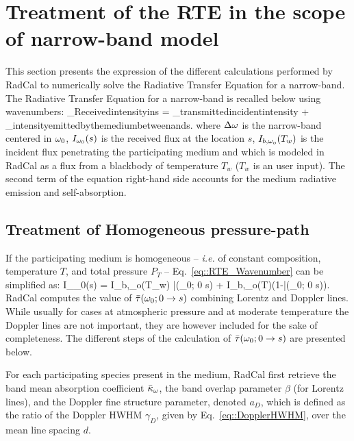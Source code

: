 \section{Treatment of the RTE in the scope of narrow-band model}\label{sec:RTE_NB}
This section presents the expression of the different calculations performed by RadCal to numerically solve the Radiative Transfer Equation for a narrow-band. The Radiative Transfer Equation for a narrow-band is recalled below using wavenumbers:
\be\label{eq::RTE_Wavenumber}
_{\rm Received\:intensity\:in\:s}  = _{\rm transmitted\:incident\:intensity} + _{\rm intensity\:emitted\:by\:the\:medium\:between\:and\:s}.
\ee
where $\Delta \omega$ is the narrow-band centered in $\omega_0$, $I_{\omega_0}(s)$ is the received flux at the location $s$, $I_{b,\omega_o}(T_w)$ is the incident flux penetrating the participating medium and which is modeled in RadCal as a flux from a blackbody of temperature $T_w$ ($T_w$ is an user input). The second term of the equation right-hand side accounts for the medium radiative emission and self-absorption.

\subsection{Treatment of Homogeneous pressure-path}
\label{sec::homogeneous_path}
If the participating medium is homogeneous -- \textit{i.e.} of constant composition, temperature $T$, and total pressure $P_T$ -- Eq.~\ref{eq::RTE_Wavenumber} can be simplified as:
\be\label{eq::RTE_wavenumber_H}
I_{\om_0}(s) = I_{\rm b,\om_o}(T_w) \bar{\tau}(\om_0; 0 \rightarrow s) + I_{\rm b,\om_o}(T)(1-\bar{\tau}(\om_0; 0 \rightarrow s)).
\ee
RadCal computes the value of $\bar{\tau}(\omega_0; 0 \rightarrow s)$ combining Lorentz and Doppler lines. While usually for cases at atmospheric pressure and at moderate temperature the Doppler lines are not important, they are however included for the sake of completeness. The different steps of the calculation of $\bar{\tau}(\omega_0; 0 \rightarrow s)$ are presented below.

For each participating species present in the medium, RadCal first retrieve the band mean absorption coefficient $\bar{\kappa}_{\omega}$, the band overlap parameter $\beta$ (for Lorentz lines), and the Doppler fine structure parameter, denoted $a_D$, which is defined as the ratio of the Doppler HWHM $\gamma_D$, given by Eq.~\ref{eq::DopplerHWHM}, over the mean line spacing $d$.

